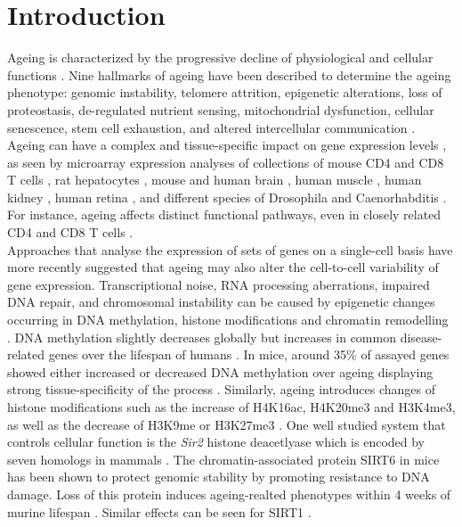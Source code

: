 
\section{Introduction}

Ageing is characterized by the progressive decline of physiological and cellular functions \citep{Lopez-Otin2013, Booth2016}. Nine hallmarks of ageing have been described to determine the ageing phenotype: genomic instability, telomere attrition, epigenetic alterations, loss of proteostasis, de-regulated nutrient sensing, mitochondrial dysfunction, cellular senescence, stem cell exhaustion, and altered intercellular communication \citep{Lopez-Otin2013}. Ageing can have a complex and tissue-specific impact on gene expression levels \citep{Zahn2007}, as seen by microarray expression analyses of collections of mouse CD4\plus{} and CD8\plus{} T cells \citep{Mirza2011}, rat hepatocytes \citep{Tollet-Egnell2000}, mouse and human brain \citep{Lu2004, Lee2000}, human muscle \citep{Welle2003, Zahn2006}, human kidney \citep{Rodwell2004}, human retina \citep{Yoshida2002}, and different species of Drosophila and Caenorhabditis \citep{Mccarroll2004}. For instance, ageing affects distinct functional pathways, even in closely related CD4\plus{} and CD8\plus{} T cells \citep{Mirza2011}. \\

Approaches that analyse the expression of sets of genes on a single-cell basis have more recently suggested that ageing may also alter the cell-to-cell variability of gene expression. Transcriptional noise, RNA processing aberrations, impaired DNA repair, and chromosomal instability can be caused by epigenetic changes occurring in DNA methylation, histone modifications and chromatin remodelling \citep{Lopez-Otin2013}. DNA methylation slightly decreases globally but increases in common disease-related genes over the lifespan of humans \citep{Talens2012}. In mice, around 35\% of assayed genes showed either increased or decreased DNA methylation over ageing displaying strong tissue-specificity of the process \citep{Maegawa2010}. Similarly, ageing introduces changes of histone modifications such as the increase of H4K16ac, H4K20me3 and H3K4me3, as well as the decrease of H3K9me or H3K27me3 \citep{Han2012, Fraga2007}. One well studied system that controls cellular function is the \emph{Sir2} histone deacetlyase which is encoded by seven homologs in mammals \citep{Houtkooper2016}. The chromatin-associated protein SIRT6 in mice has been shown to protect genomic stability by promoting resistance to DNA damage. Loss of this protein induces ageing-realted phenotypes within 4 weeks of murine lifespan \cite{Mostoslavsky2006}. Similar effects can be seen for SIRT1 \cite{Oberdoerffer2008}.\\


